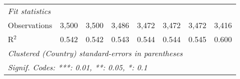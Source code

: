 \begin{tabular}{lccccccc}
   \midrule \emph{Fit statistics}\\
   Observations                                                     & 3,500          & 3,500          & 3,486          & 3,472          & 3,472          & 3,472          & 3,416\\  
   R$^2$                                                            & 0.542          & 0.542          & 0.543          & 0.544          & 0.544          & 0.545          & 0.600\\  
   \midrule
   \multicolumn{8}{l}{\emph{Clustered (Country) standard-errors in parentheses}}\\
   \multicolumn{8}{l}{\emph{Signif. Codes: ***: 0.01, **: 0.05, *: 0.1}}\\
\end{tabular}
\par\endgroup


